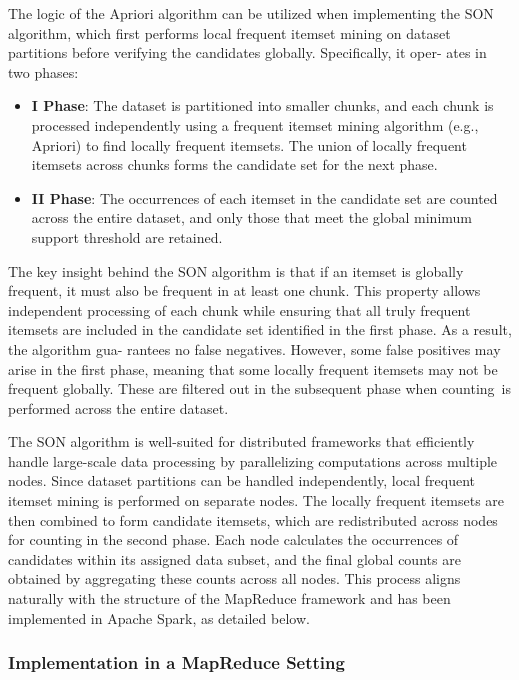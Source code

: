 \documentclass{Class/julia}
\begin{document}
The logic of the Apriori algorithm can be utilized when implementing the SON algorithm, which first performs local frequent itemset mining on dataset partitions before verifying the candidates globally. Specifically, it oper- ates in two phases:

\begin{itemize}
\item \textbf{I Phase}: The dataset is partitioned into smaller chunks, and each chunk is processed independently using a frequent itemset mining algorithm (e.g., Apriori) to find locally frequent itemsets. The union of locally frequent itemsets across chunks forms the candidate set for the next phase.
\item \textbf{II Phase}: The occurrences of each itemset in the candidate set are counted across the entire dataset, and only those that meet the global minimum support threshold are retained.
\end{itemize}

The key insight behind the SON algorithm is that if an itemset is globally frequent, it must also be frequent in at least one chunk. This property allows independent processing of each chunk while ensuring that all truly frequent itemsets are included in the candidate set identified in the first phase. As a result, the algorithm gua- rantees no false negatives. However, some false positives may arise in the first phase, meaning that some locally frequent itemsets may not be frequent globally. These are filtered out in the subsequent phase when counting~is performed across the entire dataset.

The SON algorithm is well-suited for distributed frameworks that efficiently handle large-scale data processing by parallelizing computations across multiple nodes. Since dataset partitions can be handled independently, local frequent itemset mining is performed on separate nodes. The locally frequent itemsets are then combined to form candidate itemsets, which are redistributed across nodes for counting in the second phase. Each node calculates the occurrences of candidates within its assigned data subset, and the final global counts are obtained by aggregating these counts across all nodes. This process aligns naturally with the structure of the MapReduce framework and has been implemented in Apache Spark, as detailed below.

\subsubsection{Implementation in a MapReduce Setting}
\end{document}
